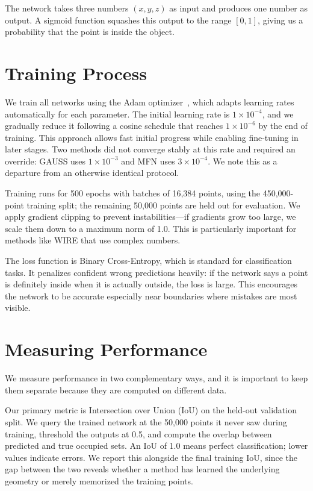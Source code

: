 The network takes three numbers $(x, y, z)$ as input and produces one number as output. A sigmoid function squashes this output to the range $[0, 1]$, giving us a probability that the point is inside the object.

\section{Training Process}

We train all networks using the Adam optimizer~\cite{kingma2014adam}, which adapts learning rates automatically for each parameter. The initial learning rate is $1 \times 10^{-4}$, and we gradually reduce it following a cosine schedule that reaches $1 \times 10^{-6}$ by the end of training. This approach allows fast initial progress while enabling fine-tuning in later stages. Two methods did not converge stably at this rate and required an override: GAUSS uses $1 \times 10^{-3}$ and MFN uses $3 \times 10^{-4}$. We note this as a departure from an otherwise identical protocol.

Training runs for 500 epochs with batches of 16,384 points, using the 450,000-point training split; the remaining 50,000 points are held out for evaluation. We apply gradient clipping to prevent instabilities---if gradients grow too large, we scale them down to a maximum norm of 1.0. This is particularly important for methods like WIRE that use complex numbers.

The loss function is Binary Cross-Entropy, which is standard for classification tasks. It penalizes confident wrong predictions heavily: if the network says a point is definitely inside when it is actually outside, the loss is large. This encourages the network to be accurate especially near boundaries where mistakes are most visible.

\section{Measuring Performance}

We measure performance in two complementary ways, and it is important to keep them separate because they are computed on different data.

Our primary metric is Intersection over Union (IoU) on the held-out validation split. We query the trained network at the 50,000 points it never saw during training, threshold the outputs at 0.5, and compute the overlap between predicted and true occupied sets. An IoU of 1.0 means perfect classification; lower values indicate errors. We report this alongside the final training IoU, since the gap between the two reveals whether a method has learned the underlying geometry or merely memorized the training points.

